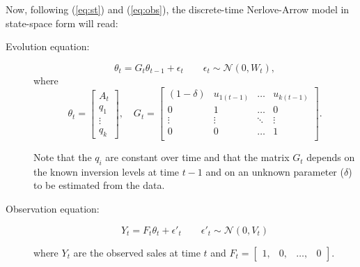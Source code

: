 Now, following  (\ref{eq:st}) and (\ref{eq:obs}), the discrete-time Nerlove-Arrow model in state-space form will read:
\begin{description}

\item[Evolution equation:]

\begin{equation} \label{eq:NA_st}
\theta_{t} = G_t \theta_{t-1} +  \epsilon_t \qquad \epsilon_t \sim \mathcal{N}(0, W_t),   
\end{equation}
\noindent where
\begin{equation*} 
\theta_{t}  = \begin{bmatrix} A_t  \\ q_1 \\  \vdots \\q_k \end{bmatrix}
, \quad
G_t =  \begin{bmatrix}
   (1- \delta) & u_{1(t-1)} &  \ldots & u_{k(t-1)} \\
   0 & 1 &   \ldots & 0 \\
   \vdots  &   \vdots & \ddots & \vdots \\
   0 & 0 &  \ldots & 1 \\
   \end{bmatrix}.
\end{equation*}


Note that the $q_i$ are constant over time and that the matrix $G_t$ depends on the known inversion levels at time $t-1$ and on an unknown parameter ($\delta$) to be estimated from the data.

 \item[Observation equation:]
 
 \begin{equation} \label{eq:NA_obs}
 Y_t = F_t \theta_t + \epsilon'_t \qquad \epsilon'_t \sim \mathcal{N}(0, V_t)  
 \end{equation}

 
 where $Y_t$ are the observed sales at time $t$ and $F_t = \begin{bmatrix} 1,  & 0 , & \ldots, & 0 \end{bmatrix}$.
\end{description}


